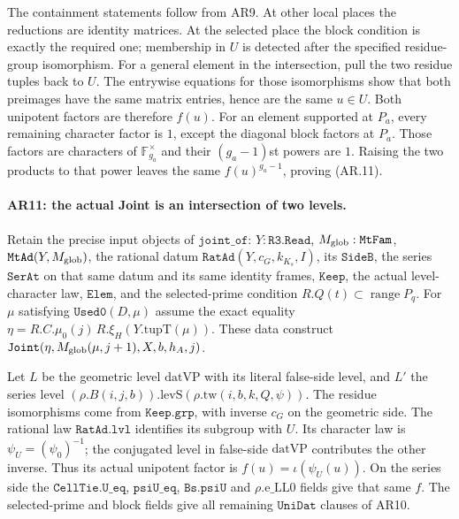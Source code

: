 The containment statements follow from AR9. At other local places
the reductions are identity matrices. At the selected place the
block condition is exactly the required one; membership in $U$ is
detected after the specified residue-group isomorphism.
For a general element in the intersection, pull the two residue
tuples back to $U$. The entrywise equations for those isomorphisms
show that both preimages have the same matrix entries, hence are
the same $u\in U$. Both unipotent factors are therefore $f(u)$.
For an element supported at $P_a$, every remaining character factor
is $1$, except the diagonal block factors at $P_a$. Those factors
are characters of $\mathbb F_{g_a}^{\times}$ and their
$(g_a-1)$st powers are $1$. Raising the two products to that power
leaves the same $f(u)^{g_a-1}$, proving (AR.11).

\paragraph{AR11: the actual Joint is an intersection of two levels.}
Retain the precise input objects of $\texttt{joint\_of}$:
$Y:\texttt{R3.Read}$, $M_{\rm glob}:\texttt{MtFam}$,
$\texttt{MtAd}(Y,M_{\rm glob})$, the rational datum
$\texttt{RatAd}(Y,c_G,k_{K_s},I)$, its $\texttt{SideB}$, the
series $\texttt{SerAt}$ on that same datum and its same identity
frames, $\texttt{Keep}$, the actual level-character law,
$\texttt{Elem}$, and the selected-prime condition
$R.Q(t)\subset\operatorname{range}P_q$.
For $\mu$ satisfying $\texttt{Used0}(D,\mu)$ assume the exact equality
$\eta=R.C.\mu_0(j)\,R.\xi_H(Y.\mathrm{tupT}(\mu))$.
These data construct $\texttt{Joint}(\eta,M_{\rm glob}(\mu,j+1),X,b,h_A,j)$.

Let $L$ be the geometric level $\mathrm{datVP}$ with its literal
false-side level, and $L'$ the series level
$(\rho.B(i,j,b)).\mathrm{levS}(\rho.\mathrm{tw}(i,b,k,Q,\psi))$.
The residue isomorphisms come from $\texttt{Keep.grp}$, with
inverse $c_G$ on the geometric side. The rational law
$\texttt{RatAd.lvl}$ identifies its subgroup with $U$.
Its character law is
$\psi_U=(\psi_0)^{-1}$; the conjugated level in false-side
$\mathrm{datVP}$ contributes the other inverse. Thus its actual
unipotent factor is $f(u)=\iota(\psi_U(u))$.
On the series side the $\texttt{CellTie.U\_eq}$,
$\texttt{psiU\_eq}$, $\texttt{Bs.psiU}$ and $\rho.\mathrm{e\_LL0}$
fields give that same $f$. The selected-prime and block fields give
all remaining $\texttt{UniDat}$ clauses of AR10.

